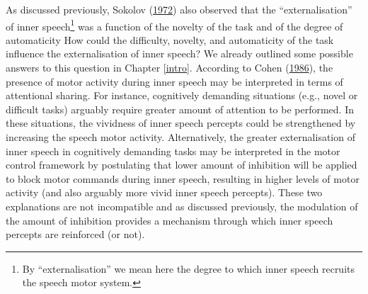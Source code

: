 \documentclass[a4paper,12pt,twoside,openright,oldfontcommands]{memoir}
\let\rmarkdownfootnote\footnote%
\def\footnote{\protect\rmarkdownfootnote}
\begin{document}
As discussed previously, Sokolov (\protect\hyperlink{ref-sokolov_inner_1972}{1972}) also observed that the \enquote{externalisation} of inner speech\footnote{By \enquote{externalisation} we mean here the degree to which inner speech recruits the speech motor system.} was a function of the novelty of the task and of the degree of automaticity How could the difficulty, novelty, and automaticity of the task influence the externalisation of inner speech? We already outlined some possible answers to this question in Chapter \ref{intro}. According to Cohen (\protect\hyperlink{ref-cohen_motor_1986}{1986}), the presence of motor activity during inner speech may be interpreted in terms of attentional sharing. For instance, cognitively demanding situations (e.g., novel or difficult tasks) arguably require greater amount of attention to be performed. In these situations, the vividness of inner speech percepts could be strengthened by increasing the speech motor activity. Alternatively, the greater externalisation of inner speech in cognitively demanding tasks may be interpreted in the motor control framework by postulating that lower amount of inhibition will be applied to block motor commands during inner speech, resulting in higher levels of motor activity (and also arguably more vivid inner speech percepts). These two explanations are not incompatible and as discussed previously, the modulation of the amount of inhibition provides a mechanism through which inner speech percepts are reinforced (or not).
\end{document}
